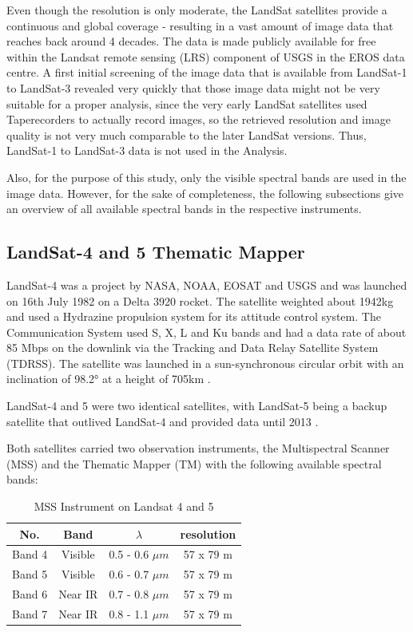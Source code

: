 Even though the resolution is only moderate, the LandSat satellites provide a continuous and global coverage - resulting in a vast amount of image data that reaches back around 4 decades. The data is made publicly available for free within the Landsat remote sensing (LRS) component of USGS in the EROS data centre.\citep{remote:usgs}
A first initial screening of the image data that is available from LandSat-1 to LandSat-3 revealed very quickly that those image data might not be very suitable for a proper analysis, since the very early LandSat satellites used Taperecorders to actually record images, so the retrieved resolution and image quality is not very much comparable to the later LandSat versions. Thus, LandSat-1 to LandSat-3 data is not used in the Analysis.

Also, for the purpose of this study, only the visible spectral bands are used in the image data. However, for the sake of completeness, the following subsections give an overview of all available spectral bands in the respective instruments.

\subsection{LandSat-4 and 5 Thematic Mapper}
LandSat-4 was a project by NASA, NOAA, EOSAT and USGS and was launched on 16th July 1982 on a Delta 3920 rocket. The satellite weighted about 1942kg and used a Hydrazine propulsion system for its attitude control system. The Communication System used S, X, L and  Ku bands and had a data rate of about 85 Mbps on the downlink via the Tracking and Data Relay Satellite System (TDRSS). The satellite was launched in a sun-synchronous circular orbit with an inclination of 98.2° at a height of 705km \citep{l4:usgs}.


LandSat-4 and 5 were two identical satellites, with LandSat-5 being a backup satellite that outlived LandSat-4 and provided data until 2013 \citep{l5:wiki,l5:usgs}.

Both satellites carried two observation instruments, the Multispectral Scanner (MSS) and the Thematic Mapper (TM) with the following available spectral bands:

\begin{table} [h!]
	\centering
	\begin{tabular}{ | c | c | c | c |}
	\hline
	\textbf{No.} & \textbf{Band} & \textbf{$\lambda$} & \textbf{resolution} \\
	\hline
	Band 4 & Visible & 0.5 - 0.6 $\mu m$ & {57 x 79 m} \\
	Band 5 & Visible & 0.6 - 0.7 $\mu m$ & {57 x 79 m} \\
	Band 6 & Near IR & 0.7 - 0.8 $\mu m$ & {57 x 79 m} \\
	Band 7 & Near IR & 0.8 - 1.1 $\mu m$ & {57 x 79 m} \\
	\hline
	\end{tabular}
	\caption{MSS Instrument on Landsat 4 and 5\citep{l4:usgs}\citep{l5:usgs}}
	\label{tab:L45MSS}
\end{table}

